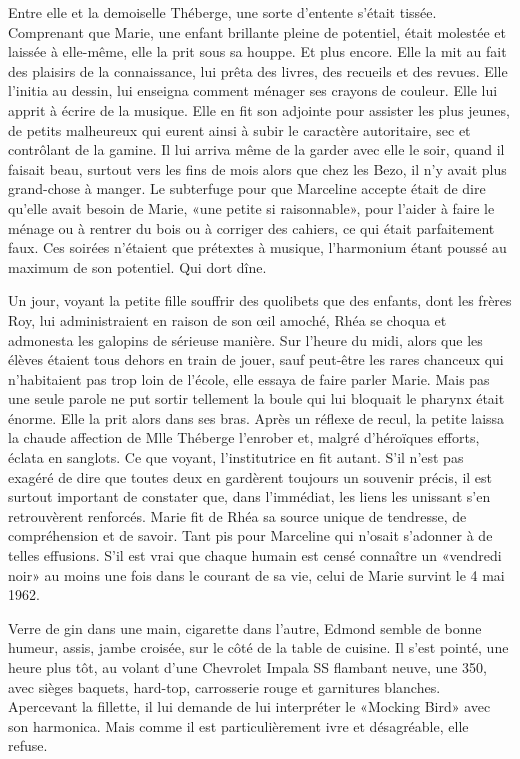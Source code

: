 Entre elle et la demoiselle Théberge, une sorte d’entente s’était tissée. Comprenant que Marie, une enfant brillante pleine de potentiel, était molestée et laissée à elle-même, elle la prit sous sa houppe. Et plus encore. Elle la mit au fait des plaisirs de la connaissance, lui prêta des livres, des recueils et des revues. Elle l’initia au dessin, lui enseigna comment ménager ses crayons de couleur. Elle lui apprit à écrire de la musique. Elle en fit son adjointe pour assister les plus jeunes, de petits malheureux qui eurent ainsi à subir le caractère autoritaire, sec et contrôlant de la gamine. Il lui arriva même de la garder avec elle le soir, quand il faisait beau, surtout vers les fins de mois alors que chez les Bezo, il n’y avait plus grand-chose à manger. Le subterfuge pour que Marceline accepte était de dire qu’elle avait besoin de Marie, «une petite si raisonnable», pour l’aider à faire le ménage ou à rentrer du bois ou à corriger des cahiers, ce qui était parfaitement faux. Ces soirées n’étaient que prétextes à musique, l’harmonium étant poussé au maximum de son potentiel. Qui dort dîne.

Un jour, voyant la petite fille souffrir des quolibets que des enfants, dont les frères Roy, lui administraient en raison de son œil amoché, Rhéa se choqua et admonesta les galopins de sérieuse manière. Sur l’heure du midi, alors que les élèves étaient tous dehors en train de jouer, sauf peut-être les rares chanceux qui n’habitaient pas trop loin de l’école, elle essaya de faire parler Marie. Mais pas une seule parole ne put sortir tellement la boule qui lui bloquait le pharynx était énorme. Elle la prit alors dans ses bras. Après un réflexe de recul, la petite laissa la chaude affection de Mlle Théberge l’enrober et, malgré d’héroïques efforts, éclata en sanglots. Ce que voyant, l’institutrice en fit autant. S’il n’est pas exagéré de dire que toutes deux en gardèrent toujours un souvenir précis, il est surtout important de constater que, dans l’immédiat, les liens les unissant s’en retrouvèrent renforcés. Marie fit de Rhéa sa source unique de tendresse, de compréhension et de savoir. Tant pis pour Marceline qui n’osait s’adonner à de telles effusions.
S’il est vrai que chaque humain est censé connaître un «vendredi noir» au moins une fois dans le courant de sa vie, celui de Marie survint le 4 mai 1962.

Verre de gin dans une main, cigarette dans l’autre, Edmond semble de bonne humeur, assis, jambe croisée, sur le côté de la table de cuisine. Il s’est pointé, une heure plus tôt, au volant d’une Chevrolet Impala SS flambant neuve, une 350, avec sièges baquets, hard-top, carrosserie rouge et garnitures blanches. Apercevant la fillette, il lui demande de lui interpréter le «Mocking Bird» avec son harmonica. Mais comme il est particulièrement ivre et désagréable, elle refuse.

